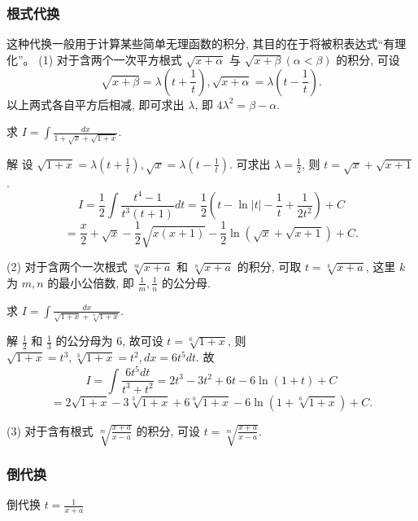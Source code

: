 \documentclass[lang=cn,newtx,10pt,scheme=chinese]{elegantbook}
\begin{document}
    \subsubsection{根式代换}
这种代换一般用于计算某些简单无理函数的积分, 其目的在于将被积表达式“有理化”。
(1) 对于含两个一次平方根式 $\sqrt{x + \alpha}$ 与 $\sqrt{x + \beta} (\alpha < \beta)$ 的积分, 可设
$$
\sqrt{x + \beta} = \lambda \left(t + \frac{1}{t}\right), \sqrt{x + \alpha} = \lambda \left(t - \frac{1}{t}\right).
$$
以上两式各自平方后相减, 即可求出 $\lambda$, 即 $4\lambda^2 = \beta - \alpha$.

\begin{example}
  求 $I = \int \frac{dx}{1 + \sqrt{x} + \sqrt{1 + x}}$.
\end{example}
\begin{solution}
  解 设 $\sqrt{1 + x} = \lambda \left(t + \frac{1}{t}\right), \sqrt{x} = \lambda \left(t - \frac{1}{t}\right)$. 可求出 $\lambda = \frac{1}{2}$, 则 $t = \sqrt{x} + \sqrt{x + 1}$.
  $$
  I = \frac{1}{2} \int \frac{t^4 - 1}{t^3(t + 1)} dt = \frac{1}{2} \left(t - \ln|t| - \frac{1}{t} + \frac{1}{2t^2}\right) + C
  $$
  $$
  = \frac{x}{2} + \sqrt{x} - \frac{1}{2}\sqrt{x(x + 1)} - \frac{1}{2}\ln(\sqrt{x} + \sqrt{x + 1}) + C.
  $$
\end{solution}

(2) 对于含两个一次根式 $\sqrt[m]{x + a}$ 和 $\sqrt[n]{x + a}$ 的积分, 可取 $t = \sqrt[k]{x + a}$, 这里 $k$ 为 $m, n$ 的最小公倍数, 即 $\frac{1}{m}, \frac{1}{n}$ 的公分母.

\begin{example}
  求 $I = \int \frac{dx}{\sqrt{1 + x} + \sqrt[3]{1 + x}}$.
\end{example}
\begin{solution}
  解 $\frac{1}{2}$ 和 $\frac{1}{3}$ 的公分母为 6, 故可设 $t = \sqrt[6]{1 + x}$, 则 $\sqrt{1 + x} = t^3, \sqrt[3]{1 + x} = t^2, dx = 6t^5 dt$. 故
  $$
  I = \int \frac{6t^5 dt}{t^3 + t^2} = 2t^3 - 3t^2 + 6t - 6 \ln(1 + t) + C
  $$
  $$
  = 2\sqrt{1 + x} - 3\sqrt[3]{1 + x} + 6\sqrt[6]{1 + x} - 6 \ln(1 + \sqrt[6]{1 + x}) + C.
  $$
\end{solution}

(3) 对于含有根式 $\sqrt[m]{\frac{x + a}{x - a}}$ 的积分, 可设 $t = \sqrt[m]{\frac{x + a}{x - a}}$.
    \subsubsection{倒代换}

     倒代换 $t = \frac{1}{x + a}$
\end{document}
